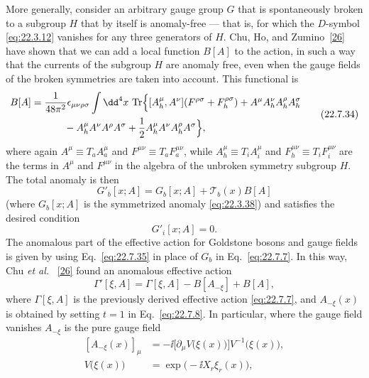 More generally, consider an arbitrary gauge group $G$ that is
spontaneously broken to a subgroup $H$ that by itself is anomaly-free
--- that is, for which the $D$-symbol \eqref{eq:22.3.12} vanishes for any
three generators of $H$. Chu, Ho, and Zumino~\hyperref[ch22-ref-26]{[26]}
have shown that we can add a local function $B[A]$ to the action, in such
a way that the currents of the subgroup $H$ are anomaly free, even when
the gauge fields of the broken symmetries are taken into account. This
functional is
\begin{equation}
 \begin{aligned}
 B[A]
 ={}&\frac{1}{48\pi^2}\epsilon_{\mu\nu\rho\sigma}\int \dd^4x\,
 \operatorname{Tr}\Bigl\{
 [A_h^\mu,A^\nu](F^{\rho\sigma}+F_h^{\rho\sigma})
 +A^\mu A_h^\nu A_h^\rho A_h^\sigma
 \\
 &\qquad{}
 -A_h^\mu A^\nu A^\rho A^\sigma
 +\frac{1}{2}A_h^\mu A^\nu A_h^\rho A^\sigma
 \Bigr\},
 \end{aligned}
 \tag{22.7.34}\label{eq:22.7.34}
\end{equation}
where again $A^\mu\equiv T_a A_a^\mu$ and
$F^{\mu\nu}\equiv T_a F_a^{\mu\nu}$, while
$A_h^\mu\equiv T_iA_i^\mu$ and $F_h^{\mu\nu}\equiv T_iF_i^{\mu\nu}$ are
the terms in $A^\mu$ and $F^{\mu\nu}$ in the algebra of the unbroken
symmetry subgroup $H$. The total anomaly is then
\begin{equation}
 G'_b[x;A]
 =G_b[x;A]+\mathcal T_b(x)B[A]
 \tag{22.7.35}\label{eq:22.7.35}
\end{equation}
(where $G_b[x;A]$ is the symmetrized anomaly
\eqref{eq:22.3.38}) and satisfies the desired condition
\begin{equation}
 G'_i[x;A]=0.
 \tag{22.7.36}\label{eq:22.7.36}
\end{equation}
The anomalous part of the effective action for Goldstone bosons and gauge
fields is given by using Eq.~\eqref{eq:22.7.35} in place of $G_b$ in
Eq.~\eqref{eq:22.7.7}. In this way, Chu \emph{et al.}~%
\hyperref[ch22-ref-26]{[26]} found an anomalous effective action
\begin{equation}
 \Gamma'[\xi,A]
 =\Gamma[\xi,A]-B[A_{-\xi}]+B[A],
 \tag{22.7.37}\label{eq:22.7.37}
\end{equation}
where $\Gamma[\xi,A]$ is the previously derived effective action
\eqref{eq:22.7.7}, and $A_{-\xi}(x)$ is obtained by setting $t=1$ in
Eq.~\eqref{eq:22.7.8}. In particular, where the gauge field vanishes
$A_{-\xi}$ is the pure gauge field
\[
 \begin{aligned}
 [A_{-\xi}(x)]_\mu
 &=-\ii\bigl[\partial_\mu V\bigl(\xi(x)\bigr)\bigr]
 V^{-1}\bigl(\xi(x)\bigr),
 \\
 V\bigl(\xi(x)\bigr)
 &=\exp\bigl(-\ii X_r\xi_r(x)\bigr),
 \end{aligned}
\]
